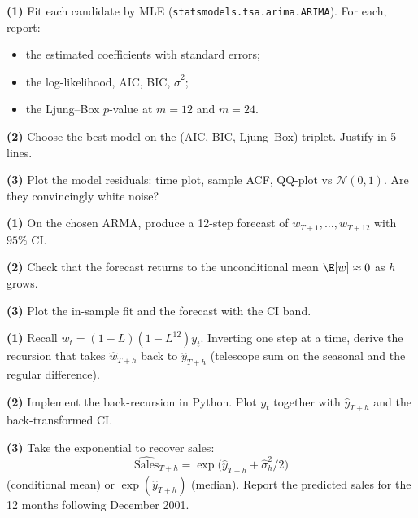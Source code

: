 \documentclass[a4paper,11pt]{article}
\begin{document}
\begin{exercise}
\textbf{(1)} Fit each candidate by MLE
(\texttt{statsmodels.tsa.arima.ARIMA}). For each, report:
\begin{itemize}
  \item the estimated coefficients with standard errors;
  \item the log-likelihood, AIC, BIC, $\widehat\sigma^2$;
  \item the Ljung--Box $p$-value at $m = 12$ and $m = 24$.
\end{itemize}

\textbf{(2)} Choose the best model on the (AIC, BIC, Ljung--Box)
triplet. Justify in 5 lines.

\textbf{(3)} Plot the model residuals: time plot, sample ACF,
QQ-plot vs $\mathcal N(0, 1)$. Are they convincingly white noise?
\end{exercise}

\begin{exercise}
\textbf{(1)} On the chosen ARMA, produce a 12-step forecast of
$w_{T+1}, \dots, w_{T+12}$ with $95\%$ CI.

\textbf{(2)} Check that the forecast returns to the unconditional
mean $\E[w] \approx 0$ as $h$ grows.

\textbf{(3)} Plot the in-sample fit and the forecast with the CI
band.
\end{exercise}

\begin{exercise}
\textbf{(1)} Recall $w_t = (1 - L)(1 - L^{12}) y_t$. Inverting one
step at a time, derive the recursion that takes
$\widehat w_{T+h}$ back to $\widehat y_{T+h}$ (telescope sum on the
seasonal and the regular difference).

\textbf{(2)} Implement the back-recursion in Python. Plot $y_t$
together with $\widehat y_{T+h}$ and the back-transformed CI.

\textbf{(3)} Take the exponential to recover sales:
\[
  \widehat{\text{Sales}}_{T+h}
  = \exp\bigl(\widehat y_{T+h} + \widehat\sigma_h^2 / 2\bigr)
\]
(conditional mean) or $\exp(\widehat y_{T+h})$ (median).
Report the predicted sales for the 12 months following December
2001.
\end{exercise}
\end{document}
